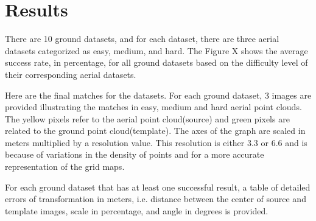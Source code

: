\documentclass[11pt]{article}
\begin{document}
    \section{Results}
    There are 10 ground datasets, and for each dataset, there are three aerial datasets categorized as easy, medium,
    and hard. The Figure X shows the average success rate, in percentage, for all ground datasets based on the
    difficulty level of their corresponding aerial datasets.


    Here are the final matches for the datasets. For each ground dataset, 3 images are provided illustrating the
    matches in easy, medium and hard aerial point clouds. The yellow pixels refer to the aerial point cloud(source)
    and green pixels are related to the ground point cloud(template). The axes of the graph are scaled in meters multiplied
    by a resolution value. This resolution is either 3.3 or 6.6 and is because of variations in the density of points
    and for a more accurate representation of the grid maps.

    For each ground dataset that has at least one successful result, a table of detailed errors of transformation
    in meters, i.e. distance between the center of source and template images, scale in percentage, and angle in
    degrees is provided.
\end{document}
